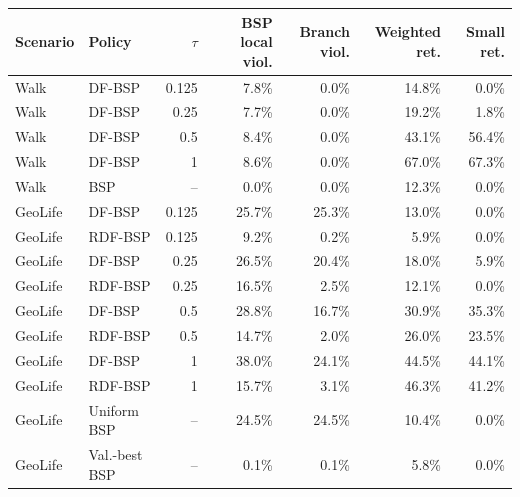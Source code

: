 \begin{tabular}{llrrrrr}
\toprule
Scenario & Policy & $\tau$ & BSP local viol. & Branch viol. & Weighted ret. & Small ret. \\
\midrule
Walk & DF-BSP & 0.125 & 7.8\% & 0.0\% & 14.8\% & 0.0\% \\
Walk & DF-BSP & 0.25 & 7.7\% & 0.0\% & 19.2\% & 1.8\% \\
Walk & DF-BSP & 0.5 & 8.4\% & 0.0\% & 43.1\% & 56.4\% \\
Walk & DF-BSP & 1 & 8.6\% & 0.0\% & 67.0\% & 67.3\% \\
Walk & BSP & -- & 0.0\% & 0.0\% & 12.3\% & 0.0\% \\
\addlinespace
GeoLife & DF-BSP & 0.125 & 25.7\% & 25.3\% & 13.0\% & 0.0\% \\
GeoLife & RDF-BSP & 0.125 & 9.2\% & 0.2\% & 5.9\% & 0.0\% \\
GeoLife & DF-BSP & 0.25 & 26.5\% & 20.4\% & 18.0\% & 5.9\% \\
GeoLife & RDF-BSP & 0.25 & 16.5\% & 2.5\% & 12.1\% & 0.0\% \\
GeoLife & DF-BSP & 0.5 & 28.8\% & 16.7\% & 30.9\% & 35.3\% \\
GeoLife & RDF-BSP & 0.5 & 14.7\% & 2.0\% & 26.0\% & 23.5\% \\
GeoLife & DF-BSP & 1 & 38.0\% & 24.1\% & 44.5\% & 44.1\% \\
GeoLife & RDF-BSP & 1 & 15.7\% & 3.1\% & 46.3\% & 41.2\% \\
GeoLife & Uniform BSP & -- & 24.5\% & 24.5\% & 10.4\% & 0.0\% \\
GeoLife & Val.-best BSP & -- & 0.1\% & 0.1\% & 5.8\% & 0.0\% \\
\bottomrule
\end{tabular}

